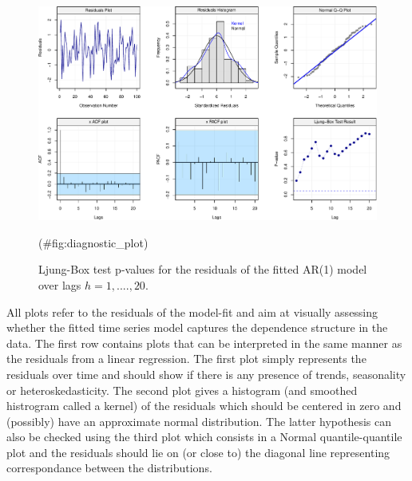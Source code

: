 \documentclass[]{book}
\theoremstyle{definition}
\theoremstyle{definition}
\theoremstyle{definition}
\theoremstyle{remark}
\begin{document}
\begin{figure}

{\centering \includegraphics{ts_files/figure-latex/diagnostic_plot-1} 

}

\caption{Ljung-Box test p-values for the residuals of the fitted AR(1) model over lags $h = 1, ...., 20$.}(\#fig:diagnostic_plot)
\end{figure}

All plots refer to the residuals of the model-fit and aim at visually
assessing whether the fitted time series model captures the dependence
structure in the data. The first row contains plots that can be
interpreted in the same manner as the residuals from a linear
regression. The first plot simply represents the residuals over time and
should show if there is any presence of trends, seasonality or
heteroskedasticity. The second plot gives a histogram (and smoothed
histrogram called a kernel) of the residuals which should be centered in
zero and (possibly) have an approximate normal distribution. The latter
hypothesis can also be checked using the third plot which consists in a
Normal quantile-quantile plot and the residuals should lie on (or close
to) the diagonal line representing correspondance between the
distributions.
\end{document}
